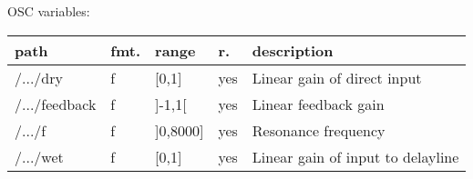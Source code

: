 \begin{snugshade}
{\footnotesize
\label{osctab:tascarapfeedbackdelay}
OSC variables:
\nopagebreak

\begin{tabularx}{\textwidth}{llllX}
\hline
path & fmt. & range & r. & description\\
\hline
/.../dry & f & [0,1] & yes & Linear gain of direct input\\
/.../feedback & f & ]-1,1[ & yes & Linear feedback gain\\
/.../f & f & ]0,8000] & yes & Resonance frequency\\
/.../wet & f & [0,1] & yes & Linear gain of input to delayline\\
\hline
\end{tabularx}
}
\end{snugshade}
